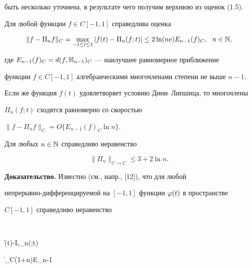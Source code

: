 быть несколько уточнена, в результате чего получим верхнюю из оценок (1.5).





\begin{lems}


Для любой функции $f\in C[-1,1]$ справедлива оценка


\begin{equation}


\|f-\Pi_n f\|_C =\max_{-1\le t\le 1}|f(t)-\Pi_n(f;t)|


\le 2\ln(ne) E_{n-1}(f)_C,\ \ n\in \Bbb N,


\end{equation}


где $E_{n-1}(f)_C=d(f,\Bbb H_{n-1})_C$ --- наилучшее равномерное приближение


функции $f\in C[-1,1]$ алгебраическими многочленами степени не выше $n-1$.


Если же функция $f(t)$ удовлетворяет условию Дини--Липшица, то многочлены


$\Pi_n(f;t)$ сходятся равномерно со скоростью


$\|f-\Pi_nf\|_C=O\{E_{n-1}(f)_C\ln n\}$.


\end{lems}





\begin{cornonum}


Для любых $n\in \Bbb N$  справедливо  неравенство


\begin{equation}


\|\Pi_n\|_{C\to C} \le 3+2\ln n.


\end{equation}


\end{cornonum}





{\bf Доказательство.} Известно (см., напр., [12]), что для любой


непрерывно-дифференцируемой на $[-1,1]$ функции $\varphi(t)$ в пространстве


$C[-1,1]$ справедливо неравенство


$$


\bigg\|


\vp(t)-\cal L_n(\vp;t)


\bigg\|_C(1+\ln n)E_{n-1}


